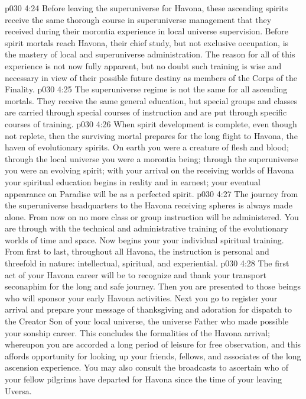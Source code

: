 \vs p030 4:24 Before leaving the superuniverse for Havona, these ascending spirits receive the same thorough course in superuniverse management that they received during their morontia experience in local universe supervision. Before spirit mortals reach Havona, their chief study, but not exclusive occupation, is the mastery of local and superuniverse administration. The reason for all of this experience is not now fully apparent, but no doubt such training is wise and necessary in view of their possible future destiny as members of the Corps of the Finality.
\vs p030 4:25 The superuniverse regime is not the same for all ascending mortals. They receive the same general education, but special groups and classes are carried through special courses of instruction and are put through specific courses of training.
\vs p030 4:26 \bibnobreakspace {} When spirit development is complete, even though not replete, then the surviving mortal prepares for the long flight to Havona, the haven of evolutionary spirits. On earth you were a creature of flesh and blood; through the local universe you were a morontia being; through the superuniverse you were an evolving spirit; with your arrival on the receiving worlds of Havona your spiritual education begins in reality and in earnest; your eventual appearance on Paradise will be as a perfected spirit.
\vs p030 4:27 The journey from the superuniverse headquarters to the Havona receiving spheres is always made alone. From now on no more class or group instruction will be administered. You are through with the technical and administrative training of the evolutionary worlds of time and space. Now begins your  your individual spiritual training. From first to last, throughout all Havona, the instruction is personal and threefold in nature: intellectual, spiritual, and experiential.
\vs p030 4:28 The first act of your Havona career will be to recognize and thank your transport seconaphim for the long and safe journey. Then you are presented to those beings who will sponsor your early Havona activities. Next you go to register your arrival and prepare your message of thanksgiving and adoration for dispatch to the Creator Son of your local universe, the universe Father who made possible your sonship career. This concludes the formalities of the Havona arrival; whereupon you are accorded a long period of leisure for free observation, and this affords opportunity for looking up your friends, fellows, and associates of the long ascension experience. You may also consult the broadcasts to ascertain who of your fellow pilgrims have departed for Havona since the time of your leaving Uversa.
